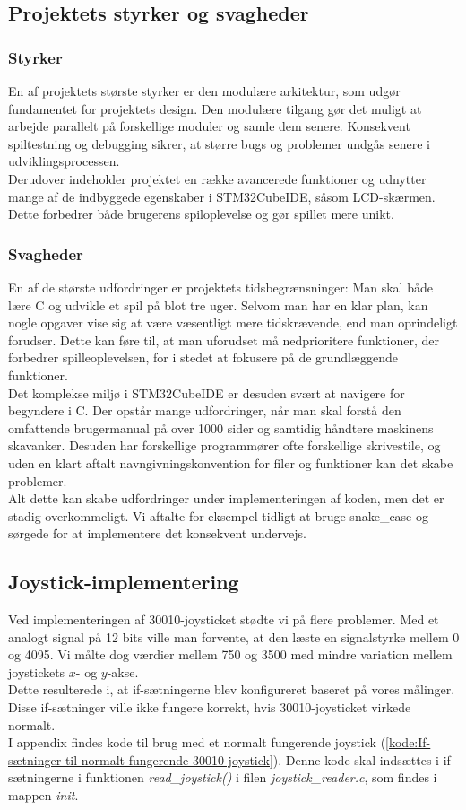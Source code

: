 \subsection{Projektets styrker og svagheder}
\subsubsection{Styrker}
En af projektets største styrker er den modulære arkitektur, som udgør fundamentet for projektets design. Den modulære tilgang gør det muligt at arbejde parallelt på forskellige moduler og samle dem senere. Konsekvent spiltestning og debugging sikrer, at større bugs og problemer undgås senere i udviklingsprocessen.\\
Derudover indeholder projektet en række avancerede funktioner og udnytter mange af de indbyggede egenskaber i STM32CubeIDE, såsom LCD-skærmen. Dette forbedrer både brugerens spiloplevelse og gør spillet mere unikt.

\subsubsection{Svagheder}
En af de største udfordringer er projektets tidsbegrænsninger: Man skal både lære C og udvikle et spil på blot tre uger. Selvom man har en klar plan, kan nogle opgaver vise sig at være væsentligt mere tidskrævende, end man oprindeligt forudser. Dette kan føre til, at man uforudset må nedprioritere funktioner, der forbedrer spilleoplevelsen, for i stedet at fokusere på de grundlæggende funktioner.\\
Det komplekse miljø i STM32CubeIDE er desuden svært at navigere for begyndere i C. Der opstår mange udfordringer, når man skal forstå den omfattende brugermanual på over 1000 sider og samtidig håndtere maskinens skavanker. Desuden har forskellige programmører ofte forskellige skrivestile, og uden en klart aftalt navngivningskonvention for filer og funktioner kan det skabe problemer.\\
Alt dette kan skabe udfordringer under implementeringen af koden, men det er stadig overkommeligt. Vi aftalte for eksempel tidligt at bruge snake_case og sørgede for at implementere det konsekvent undervejs.

\subsection{Joystick-implementering}
Ved implementeringen af 30010-joysticket stødte vi på flere problemer. Med et analogt signal på 12 bits ville man forvente, at den læste en signalstyrke mellem 0 og 4095. Vi målte dog værdier mellem 750 og 3500 med mindre variation mellem joystickets \(x\)- og \(y\)-akse.\\
Dette resulterede i, at if-sætningerne blev konfigureret baseret på vores målinger. Disse if-sætninger ville ikke fungere korrekt, hvis 30010-joysticket virkede normalt.\\
I appendix findes kode til brug med et normalt fungerende joystick (\ref{kode:If-sætninger til normalt fungerende 30010 joystick}). Denne kode skal indsættes i if-sætningerne i funktionen \textit{read\_joystick()} i filen \textit{joystick\_reader.c}, som findes i mappen \textit{init}.


